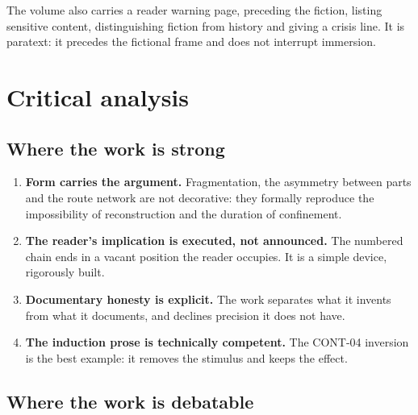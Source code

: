 \documentclass[11pt,a4paper]{article}
\begin{document}
The volume also carries a reader warning page, preceding the fiction, listing
sensitive content, distinguishing fiction from history and giving a crisis
line. It is paratext: it precedes the fictional frame and does not interrupt
immersion.

\section{Critical analysis}
\label{sec:critique}

\subsection{Where the work is strong}

\begin{enumerate}
\item \textbf{Form carries the argument.} Fragmentation, the asymmetry between
parts and the route network are not decorative: they formally reproduce the
impossibility of reconstruction and the duration of confinement.

\item \textbf{The reader's implication is executed, not announced.} The
numbered chain ends in a vacant position the reader occupies. It is a simple
device, rigorously built.

\item \textbf{Documentary honesty is explicit.} The work separates what it
invents from what it documents, and declines precision it does not have.

\item \textbf{The induction prose is technically competent.} The CONT-04
inversion is the best example: it removes the stimulus and keeps the effect.
\end{enumerate}

\subsection{Where the work is debatable}
\end{document}
